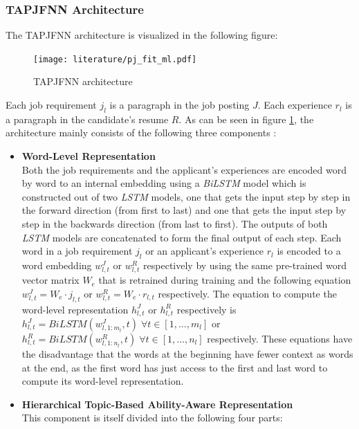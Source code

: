 \documentclass[draft,final]{thesisclass} %
\begin{document}
\subsubsection{\acs{TAPJFNN} Architecture}
The \acs{TAPJFNN} architecture is visualized in the following figure:
\begin{figure}[H]
    \centering
    \texttt{[image: literature/pj\_fit\_ml.pdf]}
    \caption{\acs{TAPJFNN} architecture \parencite[8]{pj_fit_ml}}
    \label{fig:tapjfnn_architecture}
\end{figure}
Each job requirement $j_l$ is a paragraph in the job posting $J$.
Each experience $r_l$ is a paragraph in the candidate's resume $R$.
As can be seen in figure \ref{fig:tapjfnn_architecture}, the architecture mainly consists of the following three components \parencite[8-14]{pj_fit_ml}:
\begin{itemize}
    \item \textbf{Word-Level Representation}\\
        Both the job requirements and the applicant's experiences are encoded word by word to an internal embedding using a \textit{BiLSTM} model which is constructed out of two \textit{LSTM} models, one that gets the input step by step in the forward direction (from first to last) and one that gets the input step by step in the backwards direction (from last to first).
        The outputs of both \textit{LSTM} models are concatenated to form the final output of each step.
        Each word in a job requirement $j_l$ or an applicant's experience $r_l$ is encoded to a word embedding $w^J_{l,t}$ or $w^R_{l,t}$ respectively by using the same pre-trained word vector matrix $W_e$ that is retrained during training and the following equation $w^J_{l,t} = W_e \cdot j_{l,t}$ or $w^R_{l,t} = W_e \cdot r_{l,t}$ respectively.
        The equation to compute the word-level representation $h^J_{l,t}$ or $h^R_{l,t}$ respectively is $h^J_{l,t} = BiLSTM(w^J_{l,1:m_l},t) \; \forall t \in [1,...,m_l]$ or $h^R_{l,t} = BiLSTM(w^R_{l,1:n_l},t) \; \forall t \in [1,...,n_l]$ respectively.
        These equations have the disadvantage that the words at the beginning have fewer context as words at the end, as the first word has just access to the first and last word to compute its word-level representation.
    \item \textbf{Hierarchical Topic-Based Ability-Aware Representation}\\
    This component is itself divided into the following four parts:
    \begin{itemize}

\end{itemize}
\end{itemize}
\end{document}
